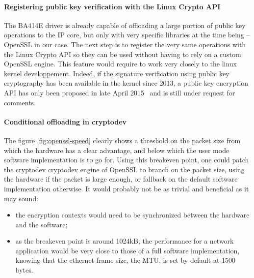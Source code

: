 \paragraph{Registering public key verification with the Linux Crypto API}
The BA414E driver is already capable of offloading a large portion of public key operations to the IP core, but only with very specific libraries at the time being -- OpenSSL in our case.
The next step is to register the very same operations with the Linux Crypto API so they can be used without having to rely on a custom OpenSSL engine.
This feature would require to work very closely to the linux kernel developpement.
Indeed, if the signature verification using public key cryptography has been available in the kernel since 2013, a public key encryption API has only been proposed in late April 2015~\cite{crypto-api-pk-encryption} and is still under request for comments.

\paragraph{Conditional offloading in cryptodev}
The figure \ref{fig:openssl-speed} clearly shows a threshold on the packet size from which the hardware has a clear advantage, and below which the user mode software implementation is to go for.
Using this breakeven point, one could patch the cryptodev cryptodev engine of OpenSSL to branch on the packet size, using the hardware if the packet is large enough, or fallback on the default software implementation otherwise. %
It would probably not be as trivial and beneficial as it may sound:
\begin{itemize}
	\item the encryption contexts would need to be synchronized between the hardware and the software;
	\item as the breakeven point is around 1024kB, the performance for a network application would be very close to those of a full software implementation, knowing that the ethernet frame size, the MTU, is set by default at 1500 bytes.
\end{itemize}

